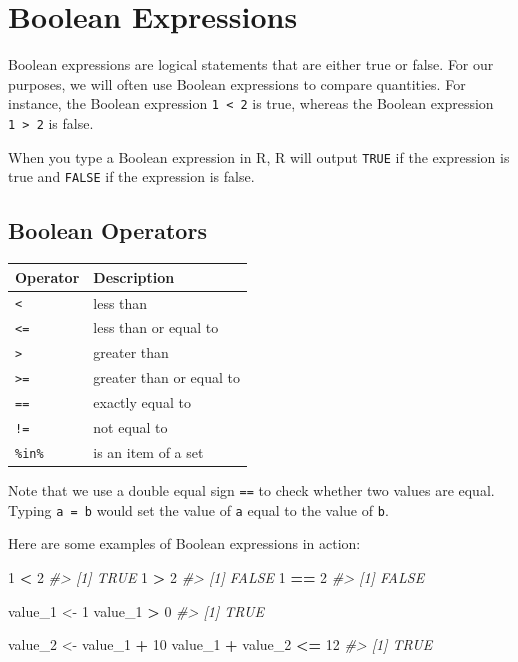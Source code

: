 \documentclass[]{book}
\newenvironment{Shaded}{\begin{snugshade}}{\end{snugshade}}
\newcommand{\DecValTok}[1]{\textcolor[rgb]{0.00,0.00,0.81}{#1}}
\newcommand{\StringTok}[1]{\textcolor[rgb]{0.31,0.60,0.02}{#1}}
\newcommand{\CommentTok}[1]{\textcolor[rgb]{0.56,0.35,0.01}{\textit{#1}}}
\newcommand{\OperatorTok}[1]{\textcolor[rgb]{0.81,0.36,0.00}{\textbf{#1}}}
\newcommand{\NormalTok}[1]{#1}
\begin{document}
\section{Boolean Expressions}\label{boolean-expressions}

Boolean expressions are logical statements that are either true or
false. For our purposes, we will often use Boolean expressions to
compare quantities. For instance, the Boolean expression
\texttt{1\ \textless{}\ 2} is true, whereas the Boolean expression
\texttt{1\ \textgreater{}\ 2} is false.

When you type a Boolean expression in R, R will output \texttt{TRUE} if
the expression is true and \texttt{FALSE} if the expression is false.

\subsection{Boolean Operators}\label{boolean-operators}

\begin{longtable}[]{@{}ll@{}}
\toprule
Operator & Description\tabularnewline
\midrule
\endhead
\texttt{\textless{}} & less than\tabularnewline
\texttt{\textless{}=} & less than or equal to\tabularnewline
\texttt{\textgreater{}} & greater than\tabularnewline
\texttt{\textgreater{}=} & greater than or equal to\tabularnewline
\texttt{==} & exactly equal to\tabularnewline
\texttt{!=} & not equal to\tabularnewline
\texttt{\%in\%} & is an item of a set\tabularnewline
\bottomrule
\end{longtable}

Note that we use a double equal sign \texttt{==} to check whether two
values are equal. Typing \texttt{a\ =\ b} would set the value of
\texttt{a} equal to the value of \texttt{b}.

Here are some examples of Boolean expressions in action:

\begin{Shaded}
\begin{Highlighting}[]
\DecValTok{1} \OperatorTok{<}\StringTok{ }\DecValTok{2}
\CommentTok{#> [1] TRUE}
\DecValTok{1} \OperatorTok{>}\StringTok{ }\DecValTok{2}
\CommentTok{#> [1] FALSE}
\DecValTok{1} \OperatorTok{==}\StringTok{ }\DecValTok{2}
\CommentTok{#> [1] FALSE}

\NormalTok{value_}\DecValTok{1}\NormalTok{ <-}\StringTok{ }\DecValTok{1}
\NormalTok{value_}\DecValTok{1} \OperatorTok{>}\StringTok{ }\DecValTok{0}
\CommentTok{#> [1] TRUE}

\NormalTok{value_}\DecValTok{2}\NormalTok{ <-}\StringTok{ }\NormalTok{value_}\DecValTok{1} \OperatorTok{+}\StringTok{ }\DecValTok{10}
\NormalTok{value_}\DecValTok{1} \OperatorTok{+}\StringTok{ }\NormalTok{value_}\DecValTok{2} \OperatorTok{<=}\StringTok{ }\DecValTok{12}
\CommentTok{#> [1] TRUE}
\end{Highlighting}
\end{Shaded}
\end{document}
